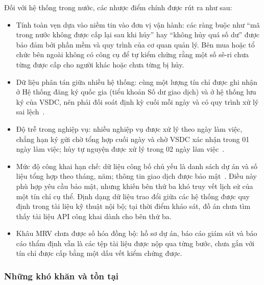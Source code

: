 Đối với hệ thống trong nước, các nhược điểm chính được rút ra như sau:
\begin{itemize}
    \item Tính toàn vẹn dựa vào niềm tin vào đơn vị vận hành: các ràng buộc như ``mã trong nước không được cấp lại sau khi hủy'' hay ``không hủy quá số dư'' được bảo đảm bởi phần mềm và quy trình của cơ quan quản lý. Bên mua hoặc tổ chức bên ngoài không có công cụ để tự kiểm chứng rằng một số sê-ri chưa từng được cấp cho người khác hoặc chưa từng bị hủy.
    \item Dữ liệu phân tán giữa nhiều hệ thống: cùng một lượng tín chỉ được ghi nhận ở Hệ thống đăng ký quốc gia (tiểu khoản Số dư giao dịch) và ở hệ thống lưu ký của VSDC, nên phải đối soát định kỳ cuối mỗi ngày và có quy trình xử lý sai lệch~\cite{vietnam2026thongtu11}.
    \item Độ trễ trong nghiệp vụ: nhiều nghiệp vụ được xử lý theo ngày làm việc, chẳng hạn ký gửi chờ tổng hợp cuối ngày và chờ VSDC xác nhận trong 01 ngày làm việc; hủy tự nguyện được xử lý trong 02 ngày làm việc~\cite{vietnam2026thongtu11}.
    \item Mức độ công khai hạn chế: dữ liệu công bố chủ yếu là danh sách dự án và số liệu tổng hợp theo tháng, năm; thông tin giao dịch được bảo mật~\cite{vietnam2026thongtu11}. Điều này phù hợp yêu cầu bảo mật, nhưng khiến bên thứ ba khó truy vết lịch sử của một tín chỉ cụ thể. Định dạng dữ liệu trao đổi giữa các hệ thống được quy định trong tài liệu kỹ thuật nội bộ; tại thời điểm khảo sát, đồ án chưa tìm thấy tài liệu API công khai dành cho bên thứ ba.
    \item Khâu MRV chưa được số hóa đồng bộ: hồ sơ dự án, báo cáo giám sát và báo cáo thẩm định vẫn là các tệp tài liệu được nộp qua từng bước, chưa gắn với tín chỉ được cấp bằng một dấu vết kiểm chứng được.
\end{itemize}

\subsubsection*{Những khó khăn và tồn tại}

